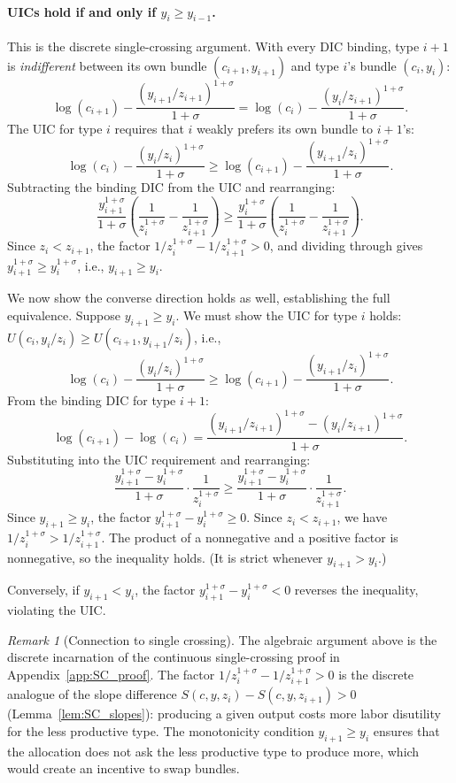 \documentclass[12pt,a4paper]{article}
\theoremstyle{definition}
\theoremstyle{plain}
\theoremstyle{remark}
\newtheorem{remark}{Remark}[section]
\begin{document}
\paragraph{UICs hold if and only if $y_i \geq y_{i-1}$.}
This is the discrete single-crossing argument. With every DIC binding, type $i+1$ is \emph{indifferent} between its own bundle $(c_{i+1}, y_{i+1})$ and type $i$'s bundle $(c_i, y_i)$:
\[
  \log(c_{i+1}) - \frac{(y_{i+1}/z_{i+1})^{1+\sigma}}{1+\sigma} = \log(c_i) - \frac{(y_i/z_{i+1})^{1+\sigma}}{1+\sigma}.
\]
The UIC for type $i$ requires that $i$ weakly prefers its own bundle to $i+1$'s:
\[
  \log(c_i) - \frac{(y_i/z_i)^{1+\sigma}}{1+\sigma} \geq \log(c_{i+1}) - \frac{(y_{i+1}/z_i)^{1+\sigma}}{1+\sigma}.
\]
Subtracting the binding DIC from the UIC and rearranging:
\[
  \frac{y_{i+1}^{1+\sigma}}{1+\sigma}\!\left(\frac{1}{z_i^{1+\sigma}} - \frac{1}{z_{i+1}^{1+\sigma}}\right) \geq \frac{y_i^{1+\sigma}}{1+\sigma}\!\left(\frac{1}{z_i^{1+\sigma}} - \frac{1}{z_{i+1}^{1+\sigma}}\right).
\]
Since $z_i < z_{i+1}$, the factor $1/z_i^{1+\sigma} - 1/z_{i+1}^{1+\sigma} > 0$, and dividing through gives $y_{i+1}^{1+\sigma} \geq y_i^{1+\sigma}$, i.e., $y_{i+1} \geq y_i$.

We now show the converse direction holds as well, establishing the full equivalence. Suppose $y_{i+1} \geq y_i$. We must show the UIC for type $i$ holds: $U(c_i, y_i/z_i) \geq U(c_{i+1}, y_{i+1}/z_i)$, i.e.,
\[
  \log(c_i) - \frac{(y_i/z_i)^{1+\sigma}}{1+\sigma} \geq \log(c_{i+1}) - \frac{(y_{i+1}/z_i)^{1+\sigma}}{1+\sigma}.
\]
From the binding DIC for type $i+1$:
\[
  \log(c_{i+1}) - \log(c_i) = \frac{(y_{i+1}/z_{i+1})^{1+\sigma} - (y_i/z_{i+1})^{1+\sigma}}{1+\sigma}.
\]
Substituting into the UIC requirement and rearranging:
\[
  \frac{y_{i+1}^{1+\sigma} - y_i^{1+\sigma}}{1+\sigma} \cdot \frac{1}{z_i^{1+\sigma}}
  \geq \frac{y_{i+1}^{1+\sigma} - y_i^{1+\sigma}}{1+\sigma} \cdot \frac{1}{z_{i+1}^{1+\sigma}}.
\]
Since $y_{i+1} \geq y_i$, the factor $y_{i+1}^{1+\sigma} - y_i^{1+\sigma} \geq 0$. Since $z_i < z_{i+1}$, we have $1/z_i^{1+\sigma} > 1/z_{i+1}^{1+\sigma}$. The product of a nonneg\-ative and a positive factor is nonneg\-ative, so the inequality holds. (It is strict whenever $y_{i+1} > y_i$.)

Conversely, if $y_{i+1} < y_i$, the factor $y_{i+1}^{1+\sigma} - y_i^{1+\sigma} < 0$ reverses the inequality, violating the UIC.

\begin{remark}[Connection to single crossing]
The algebraic argument above is the discrete incarnation of the continuous single-crossing proof in Appendix~\ref{app:SC_proof}. The factor $1/z_i^{1+\sigma} - 1/z_{i+1}^{1+\sigma} > 0$ is the discrete analogue of the slope difference $S(c,y,z_i) - S(c,y,z_{i+1}) > 0$ (Lemma~\ref{lem:SC_slopes}): producing a given output costs more labor disutility for the less productive type. The monotonicity condition $y_{i+1} \geq y_i$ ensures that the allocation does not ask the less productive type to produce more, which would create an incentive to swap bundles.
\end{remark}
\end{document}
